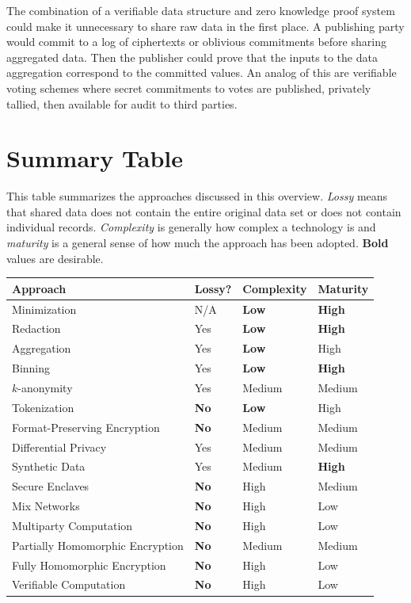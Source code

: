 \documentclass[nobib]{tufte-handout}
\begin{document}
The combination of a verifiable data structure and zero knowledge proof system
could make it unnecessary to share raw data in the first place. A publishing
party would commit to a log of ciphertexts or oblivious commitments before
sharing aggregated data. Then the publisher could prove that the inputs to the
data aggregation correspond to the committed values. An analog of this are
verifiable voting schemes where secret commitments to votes are published,
privately tallied, then available for audit to third parties.

\section{Summary Table}

This table summarizes the approaches discussed in this overview.
\textit{Lossy} means that shared data does not contain the entire original
data set or does not contain individual records. \textit{Complexity} is
generally how complex a technology is and \textit{maturity} is a general
sense of how much the approach has been adopted. \textbf{Bold} values are
desirable.

\begin{table}[ht]
  \centering
  \selectfont
  \begin{tabular}{llll}
    \toprule
    Approach & Lossy? & Complexity & Maturity \\
    \midrule
    Minimization & N/A & \textbf{Low} & \textbf{High} \\
    Redaction & Yes & \textbf{Low} & \textbf{High} \\
    Aggregation & Yes & \textbf{Low} & High  \\
    Binning & Yes & \textbf{Low} & \textbf{High} \\
    $k$-anonymity & Yes & Medium & Medium  \\
    Tokenization & \textbf{No} & \textbf{Low} & High  \\
    Format-Preserving Encryption & \textbf{No} & Medium & Medium \\
    Differential Privacy & Yes & Medium & Medium \\
    Synthetic Data & Yes & Medium & \textbf{High} \\
    Secure Enclaves & \textbf{No} & High & Medium \\
    Mix Networks & \textbf{No} & High & Low \\
    Multiparty Computation & \textbf{No} & High & Low \\
    Partially Homomorphic Encryption & \textbf{No} & Medium & Medium \\
    Fully Homomorphic Encryption & \textbf{No} & High & Low \\
    Verifiable Computation & \textbf{No} & High & Low \\
    \bottomrule
  \end{tabular}
  \label{tab:normaltab}
\end{table}

\pagebreak

 
\end{document}

